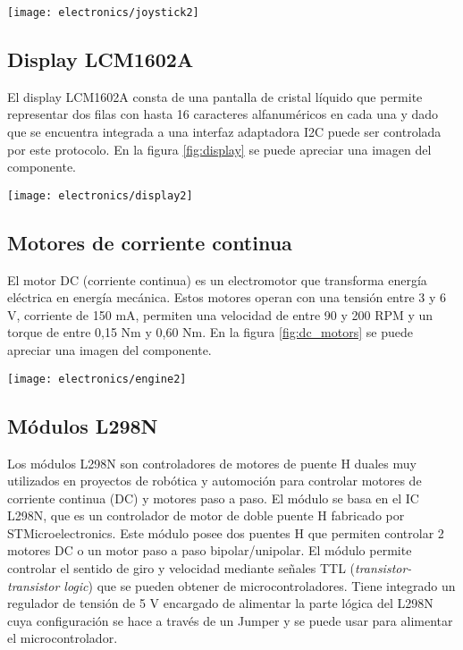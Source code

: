 \begin{center}
   \texttt{[image: electronics/joystick2]}
   \label{fig:joystick}
\end{center}


\subsection{Display LCM1602A}
El display LCM1602A \cite{LCM1602A_datasheet} consta de una pantalla de cristal líquido que permite representar dos filas con hasta 16 caracteres alfanuméricos en cada una y dado que se encuentra integrada a una interfaz adaptadora I2C puede ser controlada por este protocolo. En la figura \ref{fig:display} se puede apreciar una imagen del componente.

\begin{center}
   \texttt{[image: electronics/display2]}
   \label{fig:display}
\end{center}

\subsection{Motores de corriente continua}
El motor DC (corriente continua) \cite{dc_motor_datasheet} es un electromotor que transforma energía eléctrica en energía mecánica. Estos motores operan con una tensión entre 3 y 6 V, corriente de 150 mA, permiten una velocidad de entre 90 y 200 RPM y un torque de entre 0,15 Nm y 0,60 Nm. En la figura \ref{fig:dc_motors} se puede apreciar una imagen del componente.


\begin{center}
 \texttt{[image: electronics/engine2]}
   \label{fig:dc_motors}
\end{center}


\subsection{Módulos L298N}
Los módulos L298N son controladores de motores de puente H duales muy utilizados en proyectos de robótica y automoción para controlar motores de corriente continua (DC) y motores paso a paso. El módulo se basa en el IC L298N, que es un controlador de motor de doble puente H fabricado por STMicroelectronics. Este módulo posee dos puentes H que permiten controlar 2 motores DC o un motor paso a paso bipolar/unipolar. El módulo permite controlar el sentido de giro y velocidad mediante señales TTL (\textit{transistor-transistor logic}) que se pueden obtener de microcontroladores. Tiene integrado un regulador de tensión de 5 V encargado de alimentar la parte lógica del L298N cuya configuración se hace a través de un Jumper y se puede usar para alimentar el microcontrolador.

